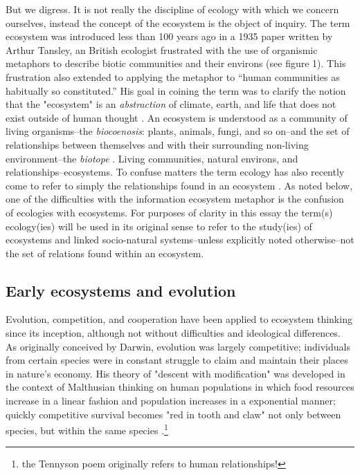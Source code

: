 But we digress. It is not really the discipline of ecology with which we concern ourselves, instead the concept of the ecosystem is the object of inquiry. The term ecosystem was introduced less than 100 years ago in a 1935 paper written by Arthur Tansley, an British ecologist frustrated with the use of organismic metaphors to describe biotic communities and their environs (see figure 1). This frustration also extended to applying the metaphor to “human communities as habitually so constituted.” His goal in coining the term was to clarify the notion that the "ecosystem" is an \textit{abstraction} of climate, earth, and life that does not exist outside of human thought \citep{tansley_1935}. An ecosystem is understood as a community of living organisms--the \textit{biocoenosis}: plants, animals, fungi, and so on--and the set of relationships between themselves and with their surrounding non-living environment--the \textit{biotope} \citep{tansley_1935,odum_1953}. Living communities, natural environs, and relationships--ecosystems. To confuse matters the term ecology has also recently come to refer to simply the relationships found in an ecosystem \citep{oed_2008}. As noted below, one of the difficulties with the information ecosystem metaphor is the confusion of ecologies with ecosystems. For purposes of clarity in this essay the term(s) ecology(ies) will be used in its original sense to refer to the study(ies) of ecosystems and linked socio-natural systems--unless explicitly noted otherwise--not the set of relations found within an ecosystem. 

\subsection{Early ecosystems and evolution}

Evolution, competition, and cooperation have been applied to ecosystem thinking since its inception, although not without difficulties and ideological differences. As originally conceived by Darwin, evolution was largely competitive; individuals from certain species were in constant struggle to claim and maintain their places in nature's economy. His theory of "descent with modification" was developed in the context of Malthusian thinking on human populations in which food resources increase in a linear fashion and population increases in a exponential manner; quickly competitive survival becomes "red in tooth and claw" not only between species, but within the same species \citep{stoddart_1966,tennyson_1849}.\footnote{the Tennyson poem originally refers to human relationships!} 

